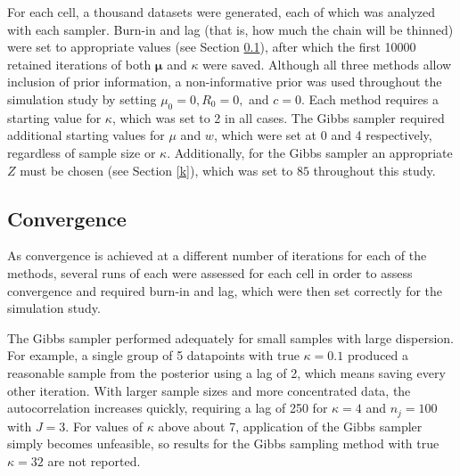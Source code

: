 \documentclass[bib]{ba/ba}
\begin{document}
For each cell, a thousand datasets were generated, each of which was analyzed with each sampler. Burn-in and lag (that is, how much the chain will be thinned) were set to appropriate values (see Section \ref{convergence}), after which the first 10000 retained iterations of both $\boldsymbol\mu$ and $\kappa$ were saved. Although all three methods allow inclusion of prior information, a non-informative prior was used throughout the simulation study by setting $\mu_0=0, R_0=0,$ and $c=0$. Each method requires a starting value for $\kappa$, which was set to 2 in all cases. The Gibbs sampler required additional starting values for $\mu$ and $w$, which were set at 0 and 4 respectively, regardless of sample size or $\kappa$. Additionally, for the Gibbs sampler an appropriate $Z$ must be chosen (see Section \ref{k}), which was set to $85$ throughout this study. 

\subsection{Convergence} \label{convergence}

As convergence is achieved at a different number of iterations for each of the methods, several runs of each were assessed for each cell in order to assess convergence and required burn-in and lag, which were then set correctly for the simulation study. 

The Gibbs sampler performed adequately for small samples with large dispersion. For example, a single group of 5 datapoints with true $\kappa = 0.1$ produced a reasonable sample from the posterior using a lag of 2, which means saving every other iteration. With larger sample sizes and more concentrated data, the autocorrelation increases quickly, requiring a lag of 250 for $\kappa = 4$ and $n_j = 100$ with $J=3$. For values of $\kappa$ above about 7, application of the Gibbs sampler simply becomes unfeasible, so results for the Gibbs sampling method with true $\kappa=32$ are not reported. 
\end{document}
